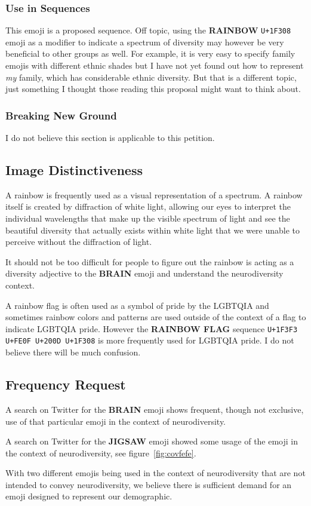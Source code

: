 \subsubsection{Use in Sequences}

This emoji is a proposed sequence. Off topic, using the \textbf{RAINBOW} \texttt{U+1F308} emoji as a modifier to indicate a spectrum of diversity may however be very beneficial to other groups as well. For example, it is very easy to specify family emojis with different ethnic shades but I have not yet found out how to represent \emph{my} family, which has considerable ethnic diversity. But that is a different topic, just something I thought those reading this proposal might want to think about.

\subsubsection{Breaking New Ground}

I do not believe this section is applicable to this petition.

\subsection{Image Distinctiveness}

A rainbow is frequently used as a visual representation of a spectrum. A rainbow itself is created by diffraction of white light, allowing our eyes to interpret the individual wavelengths that make up the visible spectrum of light and see the beautiful diversity that actually exists within white light that we were unable to perceive without the diffraction of light.

It should not be too difficult for people to figure out the rainbow is acting as a diversity adjective to the \textbf{BRAIN} emoji and understand the neurodiversity context.

A rainbow flag is often used as a symbol of pride by the LGBTQIA and sometimes rainbow colors and patterns are used outside of the context of a flag to indicate LGBTQIA pride. However the \textbf{RAINBOW FLAG} sequence \texttt{U+1F3F3 U+FE0F U+200D U+1F308} is more frequently used for LGBTQIA pride. I do not believe there will be much confusion.

\subsection{Frequency Request}

A search on Twitter for the \textbf{BRAIN} emoji shows frequent, though not exclusive, use of that particular emoji in the context of neurodiversity.

A search on Twitter for the \textbf{JIGSAW} emoji showed some usage of the emoji in the context of neurodiversity, see figure~\ref{fig:covfefe}.

With two different emojis being used in the context of neurodiversity that are not intended to convey neurodiversity, we believe there is sufficient demand for an emoji designed to represent our demographic.

